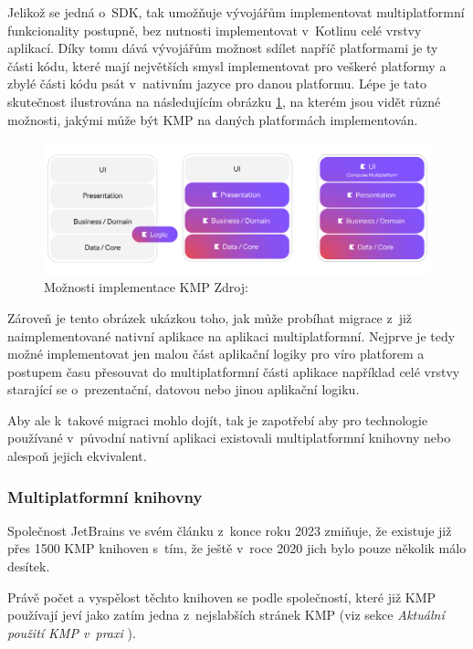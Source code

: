 Jelikož se jedná o~SDK, tak umožňuje vývojářům implementovat multiplatformní funkcionality postupně, bez nutnosti implementovat 
v~Kotlinu celé vrstvy aplikací. Díky tomu dává vývojářům možnost sdílet napříč platformami je ty části kódu, které mají největších
smysl implementovat pro veškeré platformy a zbylé části kódu psát v~nativním jazyce pro danou platformu. \cite{KMP}
Lépe je tato skutečnost ilustrována na následujícím obrázku \ref{fig:KMP_vrstvy}, na kterém jsou vidět různé možnosti,
jakými může být KMP na daných platformách implementován.

\begin{figure}[H]
  \centering
  \includegraphics[width=.7\textwidth]{KMP_vrstvy.png}
  \caption{Možnosti implementace KMP Zdroj: \cite{KMPUseCases}}
  \label{fig:KMP_vrstvy}
\end{figure}

Zároveň je tento obrázek ukázkou toho, jak může probíhat migrace z~již naimplementované nativní aplikace na aplikaci
multiplatformní. Nejprve je tedy možné implementovat jen malou část aplikační logiky pro víro platforem a postupem času přesouvat
do multiplatformní části aplikace například celé vrstvy starající se o~prezentační, datovou nebo jinou aplikační logiku. \cite{KMPUseCases}

Aby ale k~takové migraci mohlo dojít, tak je zapotřebí aby pro technologie používané v~původní nativní aplikaci existovali multiplatformní
knihovny nebo alespoň jejich ekvivalent.

\subsubsection*{Multiplatformní knihovny}
Společnost JetBrains ve svém článku z~konce roku 2023 zmiňuje, že existuje již přes 1500 KMP knihoven s~tím, že ještě v~roce 2020
jich bylo pouze několik málo desítek. \cite{KMPstable}

Právě počet a vyspělost těchto knihoven se podle společností, které již KMP používají jeví jako zatím jedna z~nejslabších stránek KMP 
(viz sekce \textit{Aktuální použití KMP v~praxi %
}).

